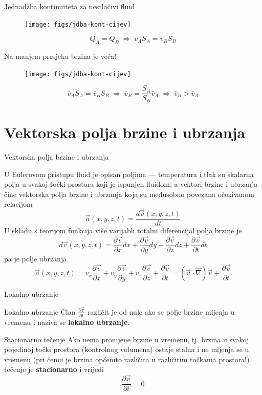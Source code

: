 \documentclass[croatian]{beamer}
\begin{document}
\begin{frame}{Jednadžba kontinuiteta za nestlačivi fluid}

\begin{figure}
\texttt{[image: figs/jdba-kont-cijev]}
\end{figure}
\[
Q_{A}=Q_{B}\;\Rightarrow\;\bar{v}_{A}S_{A}=\bar{v}_{B}S_{B}
\]
\end{frame}

\begin{frame}{Na manjem presjeku brzina je veća!}

\begin{figure}
\texttt{[image: figs/jdba-kont-cijev]}
\end{figure}
 \[
\bar{v}_{A}S_{A}=\bar{v}_{B}S_{B}\;\Rightarrow\;\bar{v}_{B}=\frac{S_{A}}{S_{B}}\bar{v}_{A}\;\Rightarrow\;\bar{v}_{B}>\bar{v}_{A}
\]
\end{frame}


\section{Vektorska polja brzine i ubrzanja}

\begin{frame}{Vektorska polja brzine i ubrzanja}

U Eulerovom pristupu fluid je opisan poljima --- temperatura i tlak
su skalarna polja u svakoj točki prostora koji je ispunjen fluidom,
a vektori brzine i ubrzanja čine vektorska polja brzine i ubrzanja
koja su međusobno povezana očekivanom relacijom
\[
\vec{a}(x,y,z,t)=\frac{d\vec{v}(x,y,z,t)}{dt}
\]
U skladu s teorijom funkcija više varijabli totalni diferencijal polja
brzine je
\[
d\vec{v}(x,y,z,t)=\frac{\partial\vec{v}}{\partial x}dx+\frac{\partial\vec{v}}{\partial y}dy+\frac{\partial\vec{v}}{\partial z}dz+\frac{\partial\vec{v}}{\partial t}dt
\]
pa je polje ubrzanja
\[
\vec{a}(x,y,z,t)=v_{x}\frac{\partial\vec{v}}{\partial x}+v_{y}\frac{\partial\vec{v}}{\partial y}+v_{z}\frac{\partial\vec{v}}{\partial z}+\frac{\partial\vec{v}}{\partial t}=(\vec{v}\cdot\vec{\nabla})\vec{v}+\frac{\partial\vec{v}}{\partial t}
\]
\end{frame}

\begin{frame}{Lokalno ubrzanje}

\begin{block}{Lokalno ubrzanje}
Član $\frac{\partial\vec{v}}{\partial t}$ različit je od nule ako
se polje brzine mijenja u vremenu i naziva se \textbf{lokalno ubrzanje}.
\end{block}
\begin{alertblock}{Stacionarno tečenje}
Ako nema promjene brzine u vremenu, tj. brzina u svakoj pojedinoj
točki prostora (kontrolnog volumena) ostaje stalna i ne mijenja se
u vremenu (pri čemu je brzina općenito različita u različitim točkama
prostora!) tečenje je \textbf{stacionarno }i vrijedi
\[
\frac{\partial\vec{v}}{\partial t}=0
\]
\end{alertblock}
\end{frame}
\end{document}
